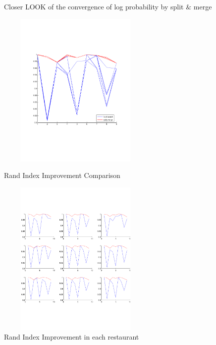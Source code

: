 \documentclass{article}
\begin{document}
\begin{spacing}{1.1}
\begin{enumerate}[(I)]
\begin{figure}[h]
\begin{minipage}[b]{0.5\textwidth}
    \caption{Closer LOOK of the convergence of log probability by split $\&$ merge}
    \label{fig:by:table}  
   \end{minipage}%
\end{figure}
\begin{figure}[h] 
  \begin{minipage}[b]{0.5\textwidth} 
    \centering 
        \includegraphics[width=3in,height=3in]{randin.pdf} 
    \caption{Rand Index Improvement Comparison} 
    \label{fig:by:table} 
  \end{minipage}%
  \begin{minipage}[b]{0.5\textwidth} 
    \centering 
    \includegraphics[width=3in,height=3in]{randin_2.pdf} 
    \caption{Rand Index Improvement in each restaurant}
    \label{fig:by:table}  
   \end{minipage}%
\end{figure}


\end{enumerate}

\end{spacing}
\end{document}
